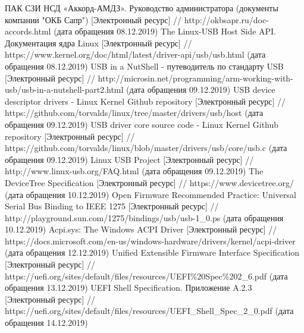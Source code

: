 \begingroup 
\renewcommand{\section}[2]{\anonsection{Библиографический список}}
\begin{thebibliography}{00}

    ПАК СЗИ НСД «Аккорд-АМДЗ». Руководство администратора (документы компании "ОКБ Сапр")
    [Электронный ресурс] //
    http://okbsapr.ru/doc-accords.html
    (дата обращения 08.12.2019)
    The Linux-USB Host Side API. Документация ядра Linux
    [Электронный ресурс] //
    https://www.kernel.org/doc/html/latest/driver-api/usb/usb.html
    (дата обращения 08.12.2019)
    USB in a NutShell - путеводитель по стандарту USB
    [Электронный ресурс] //
    http://microsin.net/programming/arm-working-with-usb/usb-in-a-nutshell-part2.html
    (дата обращения 09.12.2019)
    USB device descriptor drivers - Linux Kernel Github repository
    [Электронный ресурс] //
    https://github.com/torvalds/linux/tree/master/drivers/usb/host
    (дата обращения 09.12.2019)
    USB driver core source code - Linux Kernel Github repository
    [Электронный ресурс] //
    https://github.com/torvalds/linux/blob/master/drivers/usb/core/usb.c
    (дата обращения 09.12.2019)
    Linux USB Project
    [Электронный ресурс] //
    http://www.linux-usb.org/FAQ.html
    (дата обращения 09.12.2019)
    The DeviceTree Specification
    [Электронный ресурс] //
    https://www.devicetree.org/
    (дата обращения 10.12.2019)
    Open Firmware Recommended Practice: Universal Serial Bus Binding to IEEE 1275
    [Электронный ресурс] //
    http://playground.sun.com/1275/bindings/usb/usb-1\_0.ps
    (дата обращения 10.12.2019)
    Acpi.sys: The Windows ACPI Driver
    [Электронный ресурс] //
    https://docs.microsoft.com/en-us/windows-hardware/drivers/kernel/acpi-driver
    (дата обращения 12.12.2019)
    Unified Extensible Firmware Interface Specification
    [Электронный ресурс] //
    https://uefi.org/sites/default/files/resources/UEFI\%20Spec\%202\_6.pdf
    (дата обращения 13.12.2019)
    UEFI Shell Specification. Приложение A.2.3
    [Электронный ресурс] //
    https://uefi.org/sites/default/files/resources/UEFI\_Shell\_Spec\_2\_0.pdf
    (дата обращения 14.12.2019)

\end{thebibliography}
\endgroup

\clearpage

